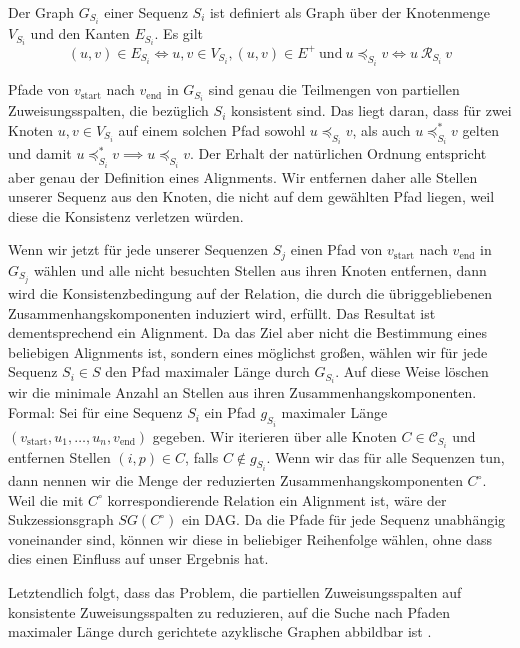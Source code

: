 \begin{definition}
	Der Graph $G_{S_i}$ einer Sequenz $S_i$ ist definiert als Graph über der Knotenmenge $V_{S_i}$ und den Kanten $E_{S_i}$. Es gilt
	\begin{equation}
		(u,v) \in E_{S_i} \Longleftrightarrow u,v \in V_{S_i}, (u,v) \in E^{+}\: \text{und}\: u \preceq_{S_i} v \Longleftrightarrow u\: \mathcal{R}_{S_i}\: v
	\end{equation}
\end{definition}

Pfade von $v_{\mathrm{start}}$ nach $v_{\mathrm{end}}$ in $G_{S_i}$ sind genau die Teilmengen von partiellen Zuweisungsspalten, die bezüglich $S_i$ konsistent sind. Das liegt daran, dass für zwei Knoten $u,v \in V_{S_i}$ auf einem solchen Pfad sowohl $u \preceq_{S_i} v$, als auch $u \preceq_{S_i}^{*} v$ gelten und damit $u \preceq_{S_i}^{*} v \implies u \preceq_{S_i} v$. Der Erhalt der natürlichen Ordnung entspricht aber genau der Definition eines Alignments. Wir entfernen daher alle Stellen unserer Sequenz aus den Knoten, die nicht auf dem gewählten Pfad liegen, weil diese die Konsistenz verletzen würden.

Wenn wir jetzt für jede unserer Sequenzen $S_j$ einen Pfad von $v_{\mathrm{start}}$ nach $v_{\mathrm{end}}$ in $G_{S_j}$ wählen und alle nicht besuchten Stellen  aus ihren Knoten entfernen, dann wird die Konsistenzbedingung auf der Relation, die durch die übriggebliebenen Zusammenhangskomponenten induziert wird, erfüllt. Das Resultat ist dementsprechend ein Alignment. Da das Ziel aber nicht die Bestimmung eines beliebigen Alignments ist, sondern eines möglichst großen, wählen wir für jede Sequenz $S_i \in S$ den Pfad maximaler Länge durch $G_{S_i}$. Auf diese Weise löschen wir die minimale Anzahl an Stellen aus ihren Zusammenhangskomponenten. Formal: Sei für eine Sequenz $S_i$ ein Pfad $g_{S_i}$ maximaler Länge $(v_{\mathrm{start}}, u_1, \dots, u_n, v_{\mathrm{end}})$ gegeben. Wir iterieren über alle Knoten $C \in \mathcal{C}_{S_i}$ und entfernen Stellen $(i,p) \in C$, falls $C \notin g_{S_i}$. Wenn wir das für alle Sequenzen tun, dann nennen wir die Menge der reduzierten Zusammenhangskomponenten $C^\circ$. Weil die mit $C^\circ$ korrespondierende Relation ein Alignment ist, wäre der Sukzessionsgraph $SG(C^\circ)$ ein DAG. Da die Pfade für jede Sequenz unabhängig voneinander sind, können wir diese in beliebiger Reihenfolge wählen, ohne dass dies einen Einfluss auf unser Ergebnis hat.

Letztendlich folgt, dass das Problem, die partiellen Zuweisungsspalten auf konsistente Zuweisungsspalten zu reduzieren, auf die Suche nach Pfaden maximaler Länge durch gerichtete azyklische Graphen abbildbar ist \cite{cpm10}.

